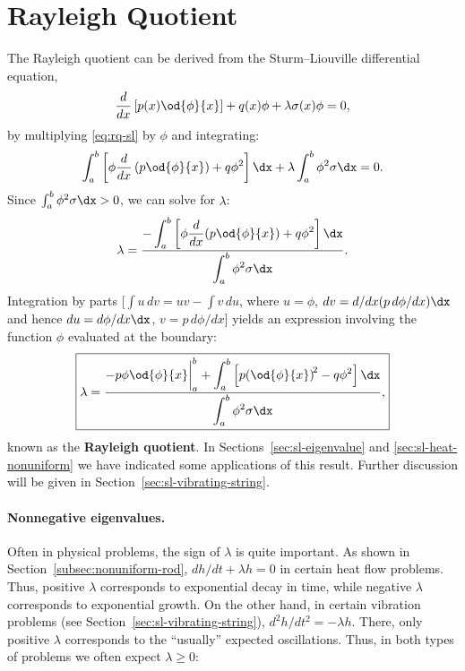 \section{Rayleigh Quotient}
\label{sec:sl-rayleigh}

The Rayleigh quotient can be derived from the Sturm--Liouville differential equation,
\begin{equation}
\label{eq:rq-sl}
\frac{d}{d x}\left[p(x)\od{\phi}{x}\right] + q(x)\phi + \lambda\sigma(x)\phi = 0,
\end{equation}
by multiplying \eqref{eq:rq-sl} by $\phi$ and integrating:
\begin{equation}
\label{eq:rq-integrated}
\int_a^b \left[\phi\frac{d}{d x}\left(p\od{\phi}{x}\right) + q\phi^2\right]\dx + \lambda\int_a^b \phi^2\sigma\dx = 0.
\end{equation}
Since $\int_a^b \phi^2\sigma\dx > 0$, we can solve for $\lambda$:
\begin{equation}
\label{eq:rq-form1}
\lambda = \frac{\displaystyle -\int_a^b \left[\phi\frac{d}{d x}\!\left(p\od{\phi}{x}\right) + q\phi^2\right]\dx}{\displaystyle\int_a^b \phi^2\sigma\dx}.
\end{equation}
Integration by parts [$\int u\,dv = uv - \int v\,du$, where $u = \phi$, $dv = d/dx(p\,d\phi/dx)\dx$ and hence $du = d\phi/dx\dx$, $v = p\,d\phi/dx$] yields an expression involving the function $\phi$ evaluated at the boundary:
\begin{equation}
\label{eq:rayleigh-quotient-main}
\boxed{\lambda = \frac{\displaystyle -p\phi\od{\phi}{x}\bigg|_a^b + \int_a^b \left[p\!\left(\od{\phi}{x}\right)^{\!2} - q\phi^2\right]\dx}{\displaystyle\int_a^b \phi^2\sigma\dx},}
\end{equation}
known as the \textbf{Rayleigh quotient}.  In Sections~\ref{sec:sl-eigenvalue} and \ref{sec:sl-heat-nonuniform} we have indicated some applications of this result.  Further discussion will be given in Section~\ref{sec:sl-vibrating-string}.

\paragraph{Nonnegative eigenvalues.}
Often in physical problems, the sign of $\lambda$ is quite important.  As shown in Section~\ref{subsec:nonuniform-rod}, $dh/dt + \lambda h = 0$ in certain heat flow problems.  Thus, positive $\lambda$ corresponds to exponential decay in time, while negative $\lambda$ corresponds to exponential growth.  On the other hand, in certain vibration problems (see Section~\ref{sec:sl-vibrating-string}), $d^2h/dt^2 = -\lambda h$.  There, only positive $\lambda$ corresponds to the ``usually'' expected oscillations.  Thus, in both types of problems we often expect $\lambda \ge 0$:

